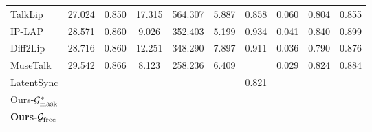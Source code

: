 \begin{table}[!t]
{\begin{tabular}{@{}lccccccccc@{}}
{TalkLip}                  & {27.024}                         & {0.850}                         & {17.315}                        & {564.307}                         & {5.887}                         & {0.858}                         & {0.060}                         & {0.804}                         & {0.855}                         \\
{IP-LAP}                   & {28.571}                         & {0.860}                         & {9.026}                         & {352.403}                         & {5.199}                         & {0.934}                         & {0.041}                         & {0.840}                         & {0.899}                         \\
{Diff2Lip}                 & {28.716}                         & {0.860}                         & {12.251}                        & {348.290}                         & {7.897}                         & {0.911}                         & {0.036}                         & {0.790}                         & {0.876}                         \\
{MuseTalk}                 & {29.542}                         & {0.866}                         & {8.123}                         & {258.236}                         & {6.409}                         & \cellcolor[HTML]{FFFFC7}{0.741} & {0.029}                         & {0.824}                         & {0.884}                         \\
{LatentSync}               & \cellcolor[HTML]{FFFFC7}{31.325} & \cellcolor[HTML]{FFFFC7}{0.903} & \cellcolor[HTML]{FFFFC7}{8.042} & \cellcolor[HTML]{FFFFC7}{235.524} & \cellcolor[HTML]{FFDA8F}{8.163} & {0.821}                         & \cellcolor[HTML]{FFFFC7}{0.024} & \cellcolor[HTML]{FFFFC7}{0.847} & \cellcolor[HTML]{FFFFC7}{0.902} \\ \midrule
{Ours-$\mathcal{G}_{\text{mask}}^*$}                 & \cellcolor[HTML]{FFDA8F}{34.253} & \cellcolor[HTML]{FFDA8F}{0.914} & \cellcolor[HTML]{FFDA8F}{7.873} & \cellcolor[HTML]{FE996B}{172.520} & \cellcolor[HTML]{FFFFC7}{8.045} & \cellcolor[HTML]{FFDA8F}{0.670} & \cellcolor[HTML]{FFDA8F}{0.018} & \cellcolor[HTML]{FFDA8F}{0.855} & \cellcolor[HTML]{FFDA8F}{0.917} \\
{\textbf{Ours-$\mathcal{G}_{\text{free}}$}}                 & \cellcolor[HTML]{FE996B}{34.425} & \cellcolor[HTML]{FE996B}{0.934} & \cellcolor[HTML]{FE996B}{7.031} & \cellcolor[HTML]{FFDA8F}{176.630} & \cellcolor[HTML]{FE996B}{8.562} & \cellcolor[HTML]{FE996B}{0.630} & \cellcolor[HTML]{FE996B}{0.014} & \cellcolor[HTML]{FE996B}{0.883} & \cellcolor[HTML]{FE996B}{0.923} \\ \bottomrule
\end{tabular}
}
\vspace{-5pt}
\end{table}

